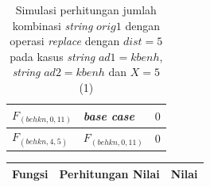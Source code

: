 \begin{appendices}
\begin{table}[H]
\begin{tabular} {|p{3cm}|p{5cm}|p{1cm}|}
  		$ F_{(behkn, 0, 11)} $ & \textit{base case} & $ 0 $ \\ \hline
  		$ F_{(behkn, 4, 5)}  $ & $F_{(behkn, 0, 11)}$ & $ 0 $ \\ \hline
  	\end{tabular}\caption{Simulasi perhitungan jumlah kombinasi \textit{string} $ orig1 $ dengan operasi \textit{replace} dengan $ dist= 5  $ pada kasus \textit{string} $ ad1=kbenh $, \textit{string} $ ad2=kbenh $ dan $ X=5 $ (1)}
  	\label{tab:g_3_orig1_5_1}
  \end{table}
  \begin{table}[H]
  	\centering
  	\begin{tabular} {|p{3cm}|p{5cm}|p{1cm}|} \hline
  		Fungsi & Perhitungan Nilai & Nilai \\ \hline		
  		

\end{tabular}
\end{table}
\end{appendices}

